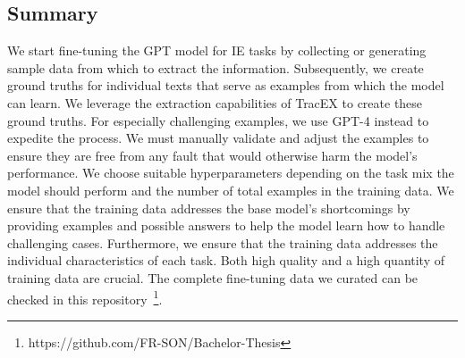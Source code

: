 \subsection*{Summary}
We start fine-tuning the GPT model for IE tasks by collecting or generating sample data from which to extract the information. Subsequently, we create ground truths for individual texts that serve as examples from which the model can learn. We leverage the extraction capabilities of TracEX to create these ground truths. For especially challenging examples, we use GPT-4 instead to expedite the process. We must manually validate and adjust the examples to ensure they are free from any fault that would otherwise harm the model's performance. We choose suitable hyperparameters depending on the task mix the model should perform and the number of total examples in the training data. We ensure that the training data addresses the base model's shortcomings by providing examples and possible answers to help the model learn how to handle challenging cases. Furthermore, we ensure that the training data addresses the individual characteristics of each task. Both high quality and a high quantity of training data are crucial. The complete fine-tuning data we curated can be checked in this repository~\footnote{https://github.com/FR-SON/Bachelor-Thesis}.